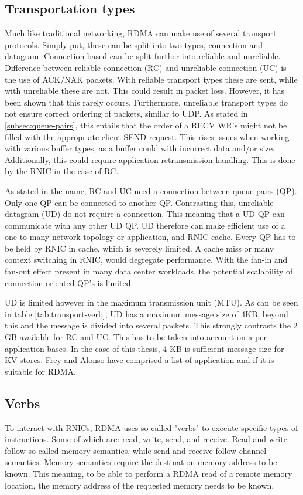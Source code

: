 \subsection{Transportation types}\label{subsec:transportation-types}
Much like traditional networking, RDMA can make use of several transport protocols.
Simply put, these can be split into two types, connection and datagram.
Connection based can be split further into reliable and unreliable.
Difference between reliable connection (RC) and unreliable connection (UC) is the use of ACK/NAK packets.
With reliable transport types these are sent, while with unreliable these are not.
This could result in packet loss.
However, it has been shown that this rarely occurs\cite{kalia2014using, kalia2016fasst}.
Furthermore, unreliable transport types do not ensure correct ordering of packets, similar to UDP.
As stated in \ref{subsec:queue-pairs}, this entails that the order of a RECV WR's might not be filled with the appropriate client SEND request.
This rises issues when working with various buffer types, as a buffer could with incorrect data and/or size.
Additionally, this could require application retransmission handling.
This is done by the RNIC in the case of RC.

As stated in the name, RC and UC need a connection between queue pairs (QP).
Only one QP can be connected to another QP.
Contrasting this, unreliable datagram (UD) do not require a connection.
This meaning that a UD QP can communicate with any other UD QP.
UD therefore can make efficient use of a one-to-many network topology or application, and RNIC cache.
Every QP has to be held by RNIC in cache, which is severely limited\cite{qiu2018toward}.
A cache miss or many context switching in RNIC, would degregate performance.
With the fan-in and fan-out effect present in many data center workloads, the potential scalability of connection oriented QP's is limited.

UD is limited however in the maximum transmission unit (MTU).
As can be seen in table \ref{tab:transport-verb}, UD has a maximum message size of 4KB, beyond this and the message is divided into several packets.
This strongly contrasts the 2 GB available for RC and UC.
This has to be taken into account on a per-application bases.
In the case of this thesis, 4 KB is sufficient message size for KV-stores.
Frey and Alonso have comprised a list of application and if it is suitable for RDMA\cite{frey2009minimizing}.

\subsection{Verbs}\label{subsec:verbs}
To interact with RNICs, RDMA uses so-called "verbs" to execute specific types of instructions.
Some of which are: read, write, send, and receive.
Read and write follow so-called memory semantics, while send and receive follow channel semantics.
Memory semantics require the destination memory address to be known.
This meaning, to be able to perform a RDMA read of a remote memory location, the memory address of the requested memory needs to be known.

